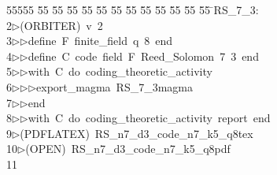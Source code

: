 %
%
\begin{tabbing}
55555 \= 55 \= 55 \= 55 \= 55 \= 55 \= 55 \= 55 \= 55 \= 55 \= 55 \= 55 \= 55 \= \>RS\_7\_3:\\[0pt]
2\>$\triangleright$\>(ORBITER)\ v\ 2\ \\[0pt]
3\>$\triangleright$\>$\triangleright$\>define\ F\ finite\_field\ q\ 8\ end\ \\[0pt]
4\>$\triangleright$\>$\triangleright$\>define\ C\ code\ field\ F\ Reed\_Solomon\ 7\ 3\ end\ \\[0pt]
5\>$\triangleright$\>$\triangleright$\>with\ C\ do\ coding\_theoretic\_activity\ \\[0pt]
6\>$\triangleright$\>$\triangleright$\>$\triangleright$\>export\_magma\ RS\_7\_3magma\ \\[0pt]
7\>$\triangleright$\>$\triangleright$\>end\ \\[0pt]
8\>$\triangleright$\>$\triangleright$\>with\ C\ do\ coding\_theoretic\_activity\ report\ end\\[0pt]
9\>$\triangleright$\>(PDFLATEX)\ RS\_n7\_d3\_code\_n7\_k5\_q8tex\\[0pt]
10\>$\triangleright$\>(OPEN)\ RS\_n7\_d3\_code\_n7\_k5\_q8pdf\\[0pt]
11\>\end{tabbing}
